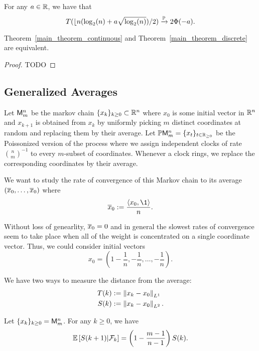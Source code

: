 \documentclass[12pt]{article}
\begin{document}
\begin{thm} \label{main_theorem_discrete}
	For any $a \in \mathbb{R}$, we have that 
	\[
		T (\lfloor{n (\log_2 (n) + a \sqrt{\log_2(n)})/2}) \xrightarrow[]{\mathbb{P}} 2 \Phi(-a).
	\]
\end{thm}

\begin{prop}
	Theorem~\ref{main_theorem_continuous} and Theorem~\ref{main_theorem_discrete} are equivalent. 
\end{prop}
\begin{proof}
	TODO
\end{proof}
\newpage

\subsection{Generalized Averages}

\begin{defn}
	Let $\mathsf{M}_m^n$ be the markov chain $\{x_k\}_{k \geq 0} \subset \mathbb{R}^n$ where $x_0$ is some initial vector in $\mathbb{R}^n$ and $x_{k+1}$ is obtained from $x_k$ by uniformly picking $m$ distinct coordinates at random and replacing them by their average. Let $\mathbb{P} \mathsf{M}_m^n = \{x_t\}_{t \in \mathbb{R}_{\geq 0}}$ be the Poissonized version of the process where we assign independent clocks of rate $\binom{n}{m}^{-1}$ to every $m$-subset of coordinates. Whenever a clock rings, we replace the corresponding coordinates by their average. 
\end{defn}

We want to study the rate of convergence of this Markov chain to its average $(\overline{x}_0, \ldots, \overline{x}_0)$ where 
\[
	\ol{x}_0 := \frac{\langle x_0, \1 \rangle}{n}.	
\]
\begin{remark}
	Without loss of genearlity, $\overline{x}_0 = 0$ and in general the slowest rates of convergence seem to take place when all of the weight is concentrated on a single coordinate vector. Thus, we could consider initial vectors 
	\[
		x_0 = \left ( 1 - \frac{1}{n}, - \frac{1}{n}, \ldots, - \frac{1}{n} \right ).
	\]	
\end{remark}
We have two ways to measure the distance from the average:
\begin{align*}
	T(k) & := \left\lVert x_k - x_0 \right\rVert_{L^1} \\
	S(k) & := \left\lVert x_k - x_0 \right\rVert_{L^2}.
\end{align*}

\begin{prop}
	Let $\{x_k\}_{k \geq 0} = \mathsf{M}_m^n$. For any $k \geq 0$, we have 
	\[
		\mathbb{E} \left [ S(k+1) | \mathcal{F}_k \right ] = \left ( 1 - \frac{m-1}{n-1} \right ) S(k).	
	\]
\end{prop}
\end{document}
